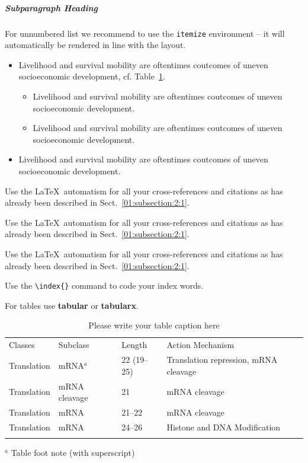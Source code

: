 \begin{bibunit}
	
	\subparagraph{Subparagraph Heading}\label{01:subparagraph:1:1}
	
	For unnumbered list we recommend to use the \verb|itemize| environment -- it will automatically be rendered in line with the layout.
	
	\begin{itemize}
		\item{Livelihood and survival mobility are oftentimes coutcomes of uneven socioeconomic development, cf. Table~\ref{01:tab:1}.}
		\begin{itemize}
			\item{Livelihood and survival mobility are oftentimes coutcomes of uneven socioeconomic development.}
			\item{Livelihood and survival mobility are oftentimes coutcomes of uneven socioeconomic development.}
		\end{itemize}
		\item{Livelihood and survival mobility are oftentimes coutcomes of uneven socioeconomic development.}
	\end{itemize}
	
	 Use the \LaTeX\ automatism for all your cross-references and citations as has already been described in Sect.~\ref{01:subsection:2:1}.
	
	 Use the \LaTeX\ automatism for all your cross-references and citations as has already been described in Sect.~\ref{01:subsection:2:1}.
	
	 Use the \LaTeX\ automatism for all your cross-references and citations as has already been described in Sect.~\ref{01:subsection:2:1}.
	
	Use the \verb|\index{}| command to code your index words.
	
	For tables use \textbf{tabular} or \textbf{tabularx}.
	
	\begin{table}[!t]
		\caption{Please write your table caption here}
		\label{01:tab:1} %
		\begin{tabular}{p{2cm}p{2.4cm}p{2cm}p{4.9cm}}
			\hline\noalign{\smallskip}
			Classes & Subclass & Length & Action Mechanism  \\
			\noalign{\smallskip}\svhline\noalign{\smallskip}
			Translation & mRNA$^a$  & 22 (19--25) & Translation repression, mRNA cleavage\\
			Translation & mRNA cleavage & 21 & mRNA cleavage\\
			Translation & mRNA  & 21--22 & mRNA cleavage\\
			Translation & mRNA  & 24--26 & Histone and DNA Modification\\
			\noalign{\smallskip}\hline\noalign{\smallskip}
		\end{tabular}
		$^a$ Table foot note (with superscript)
	\end{table}

\end{bibunit}
